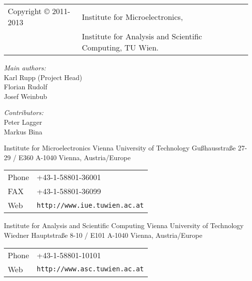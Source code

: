 
\clearpage

\begin{tabular}{ll}
Copyright {\copyright} 2011-2013 & Institute for Microelectronics, \\
                            & Institute for Analysis and Scientific Computing, TU Wien.
\end{tabular}

\vspace{2.5cm}

\textit{Main authors:}\\ 

Karl Rupp (Project Head)\\
Florian Rudolf \\
Josef Weinbub \\

\vspace{1cm}

\textit{Contributors:}\\ 

Peter Lagger \\
Markus Bina


\vspace{3.0cm}

Institute for Microelectronics\newline
Vienna University of Technology\newline
Gu\ss hausstra\ss e 27-29 / E360\newline
A-1040 Vienna, Austria/Europe\newline

\begin{tabular}{ll}
Phone  & +43-1-58801-36001\\
FAX    & +43-1-58801-36099\\
Web    & \texttt{http://www.iue.tuwien.ac.at}
\end{tabular}

\vspace{1.5cm}

Institute for Analysis and Scientific Computing\newline
Vienna University of Technology\newline
Wiedner Hauptstra\ss e 8-10 / E101\newline
A-1040 Vienna, Austria/Europe\newline

\begin{tabular}{ll}
Phone  & +43-1-58801-10101\\
Web    & \texttt{http://www.asc.tuwien.ac.at}
\end{tabular}




